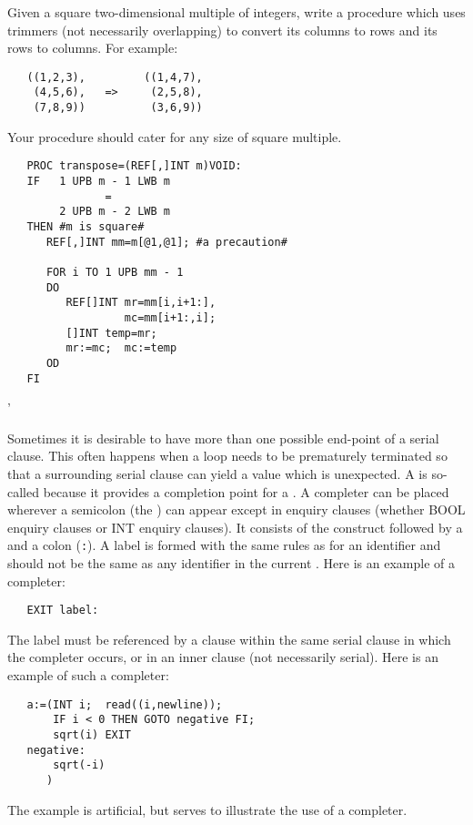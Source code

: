 \begin{exercise}
\item Given a square two-dimensional multiple of integers, write a
procedure which uses trimmers (not necessarily overlapping) to
convert its columns to rows and its rows to columns.  For example:
\begin{verbatim}
   ((1,2,3),         ((1,4,7),
    (4,5,6),   =>     (2,5,8),
    (7,8,9))          (3,6,9))
\end{verbatim}
\noindent
Your procedure should cater for any size of square multiple.
\ans \ %
\begin{verbatim}
   PROC transpose=(REF[,]INT m)VOID:
   IF   1 UPB m - 1 LWB m
               =
        2 UPB m - 2 LWB m
   THEN #m is square#
      REF[,]INT mm=m[@1,@1]; #a precaution#

      FOR i TO 1 UPB mm - 1
      DO
         REF[]INT mr=mm[i,i+1:],
                  mc=mm[i+1:,i];
         []INT temp=mr;
         mr:=mc;  mc:=temp
      OD
   FI
\end{verbatim}
'
\end{exercise}

Sometimes it is desirable to have more than one possible end-point of
a serial clause. This often happens when a loop needs to be
prematurely terminated so that a surrounding serial clause can yield
a value which is unexpected. A  is so-called because
it provides a completion point for a
.  A completer can be placed
wherever a semicolon (the ) can appear
except in enquiry clauses (whether BOOL enquiry clauses or INT
enquiry clauses). It consists of the construct  followed
by a  and a colon (\verb|:|). A label is formed with the
same rules as for an identifier and should not be the same as any
identifier in the current . Here is an example of a
completer:
\begin{verbatim}
   EXIT label:
\end{verbatim}
\noindent
The label must be referenced by a
 clause within the same
serial clause in which the completer occurs, or in an inner clause
(not necessarily serial). Here is an example of such a completer:
\begin{verbatim}
   a:=(INT i;  read((i,newline));
       IF i < 0 THEN GOTO negative FI;
       sqrt(i) EXIT
   negative:
       sqrt(-i)
      )
\end{verbatim}
\noindent
The example is artificial, but serves to illustrate the use of a
completer.

